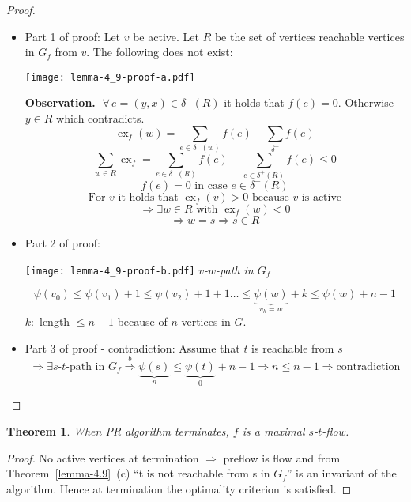 \documentclass{article}
\newtheorem{theorem}{Theorem}
\newcommand{\gath}[2]{$#1$-$#2$-path} %
\newcommand{\flow}[2]{$#1$-$#2$-flow}
\newcommand{\fall}{\;\forall\,}
\begin{document}
\begin{proof}
  \begin{itemize}
    \item Part 1 of proof:
      Let $v$ be active. Let $R$ be the set of vertices reachable vertices in $G_f$ from $v$.
      The following does not exist:
      \begin{center}
        \texttt{[image: lemma-4\_9-proof-a.pdf]}
      \end{center}

      \textbf{Observation.} $\fall e = (y, x) \in \delta^-(R)$ it holds that $f(e) = 0$. Otherwise $y \in R$ which contradicts.
      \[ \operatorname{ex}_f(w) = \sum_{e \in \delta^-(w)} f(e) - \sum_{\delta^+} f(e) \]
      \[ \sum_{w \in R} \operatorname{ex}_f = \sum_{e \in \delta^-(R)} f(e) - \sum_{e \in \delta^+(R)} f(e) \leq 0 \]
      \[ f(e) = 0 \text{ in case } e \in \delta^-(R) \]
      \[ \text{For $v$ it holds that } \operatorname{ex}_f(v) > 0 \text{ because $v$ is active} \]
      \[ \Rightarrow \exists w \in R \text{ with } \operatorname{ex}_f(w) < 0 \]
      \[ \Rightarrow w = s \Rightarrow s \in R \]
    \item Part 2 of proof:
      \begin{center}
        \texttt{[image: lemma-4\_9-proof-b.pdf]}
        \textit{\gath vw in $G_f$}
      \end{center}
      \[
        \psi(v_0) \leq \psi(v_1) + 1
          \leq \psi(v_2) + 1 + 1 \dots
          \leq \underbrace{\psi(w)}_{v_k = w} + k
          \leq \psi(w) + n - 1
      \]
      $k:$ length $\leq n-1$ because of $n$ vertices in $G$.
    \item Part 3 of proof - contradiction: Assume that $t$ is reachable from $s$
      \[
        \Rightarrow \exists \text{\gath st in } G_f
        \stackrel{b}{\Rightarrow} \underbrace{\psi(s)}_{n} \leq \underbrace{\psi(t)}_{0} + n - 1
        \Rightarrow n \leq n - 1
        \Rightarrow \text{contradiction}
      \]
  \end{itemize}
\end{proof}

\begin{theorem}\label{satz-4.10}
  When PR algorithm terminates, $f$ is a maximal \flow st.
\end{theorem}

\begin{proof}
  No active vertices at termination $\Rightarrow$ preflow is flow and from Theorem~\ref{lemma-4.9}~(c) ``t is not reachable from s in $G_f$'' is an invariant of the algorithm. Hence at termination the optimality criterion is satisfied.
\end{proof}
\end{document}
